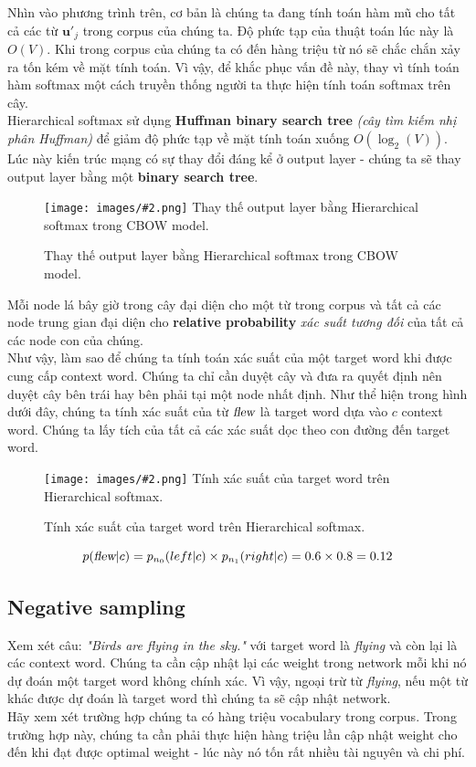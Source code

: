 \documentclass[12pt]{article}
\newcommand{\includeImage}[3]{
\begin{figure}[H]
  \centering
  \texttt{[image: images/\#2.png]}
  \def\temp{#3}\ifx\temp\empty\else\caption{#3}\fi
\end{figure}}
\begin{document}
\indent Nhìn vào phương trình trên, cơ bản là chúng ta đang tính toán hàm mũ cho tất cả các từ $\boldsymbol{u'}_j$ trong corpus của chúng ta. Độ phức tạp của thuật toán lúc này là $O(V)$. Khi trong corpus của chúng ta có đến hàng triệu từ nó sẽ chắc chắn xảy ra tốn kém về mặt tính toán. Vì vậy, để khắc phục vấn đề này, thay vì tính toán hàm softmax một cách truyền thống người ta thực hiện tính toán softmax trên cây.\\

\indent Hierarchical softmax sử dụng \textbf{Huffman binary search tree} \textit{(cây tìm kiếm nhị phân Huffman)} để giảm độ phức tạp về mặt tính toán xuống $O(\log_2(V))$. Lúc này kiến trúc mạng có sự thay đổi đáng kể ở output layer - chúng ta sẽ thay output layer bằng một \textbf{binary search tree}.

\includeImage{0.99}{11}{Thay thế output layer bằng Hierarchical softmax trong CBOW model.}

\indent Mỗi node lá bây giờ trong cây đại diện cho một từ trong corpus và tất cả các node trung gian đại diện cho \textbf{relative probability} \textit{xác suất tương đối} của tất cả các node con của chúng.\\

\indent Như vậy, làm sao để chúng ta tính toán xác suất của một target word khi được cung cấp context word. Chúng ta chỉ cần duyệt cây và đưa ra quyết định nên duyệt cây bên trái hay bên phải tại một node nhất định. Như thể hiện trong hình dưới đây, chúng ta tính xác suất của từ $\textsl{flew}$ là target word dựa vào $c$ context word. Chúng ta lấy tích của tất cả các xác suất dọc theo con đường đến target word.
\includeImage{0.8}{12}{Tính xác suất của target word trên Hierarchical softmax.}

$$p(\textsl{flew}|c) = p_{n_0}(left|c) \times p_{n_1}(right|c) = 0.6 \times 0.8 = 0.12$$

\subsection{Negative sampling}
Xem xét câu: \textsl{"Birds are flying in the sky."} với target word là \textsl{flying} và còn lại là các context word. Chúng ta cần cập nhật lại các weight trong network mỗi khi nó dự đoán một target word không chính xác. Vì vậy, ngoại trừ từ \textsl{flying}, nếu một từ khác được dự đoán là target word thì chúng ta sẽ cập nhật network.\\

\indent Hãy xem xét trường hợp chúng ta có hàng triệu vocabulary trong corpus. Trong trường hợp này, chúng ta cần phải thực hiện hàng triệu lần cập nhật weight cho đến khi đạt được optimal weight - lúc này nó tốn rất nhiều tài nguyên và chi phí.\\
\end{document}
